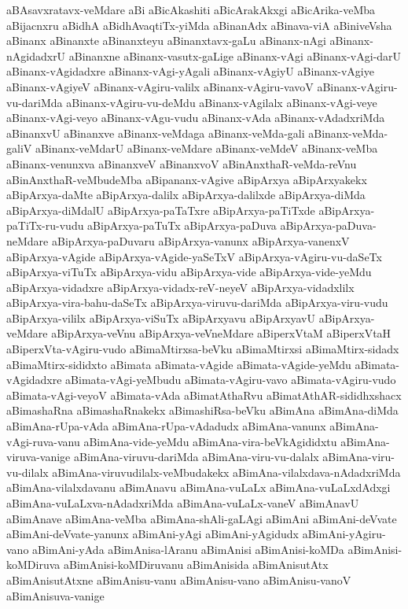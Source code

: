 {aBAsavxratavx-veMdare
aBi
aBicAkashiti
aBicArakAkxgi
aBicArika-veMba
aBijacnxru
aBidhA
aBidhAvaqtiTx-yiMda
aBinanAdx
aBinava-viA
aBiniveVsha
aBinanx
aBinanxte
aBinanxteyu
aBinanxtavx-gaLu
aBinanx-nAgi
aBinanx-nAgidadxrU
aBinanxne
aBinanx-vasutx-gaLige
aBinanx-vAgi
aBinanx-vAgi-darU
aBinanx-vAgidadxre
aBinanx-vAgi-yAgali
aBinanx-vAgiyU
aBinanx-vAgiye
aBinanx-vAgiyeV
aBinanx-vAgiru-valilx
aBinanx-vAgiru-vavoV
aBinanx-vAgiru-vu-dariMda
aBinanx-vAgiru-vu-deMdu
aBinanx-vAgilalx
aBinanx-vAgi-veye
aBinanx-vAgi-veyo
aBinanx-vAgu-vudu
aBinanx-vAda
aBinanx-vAdadxriMda
aBinanxvU
aBinanxve
aBinanx-veMdaga
aBinanx-veMda-gali
aBinanx-veMda-galiV
aBinanx-veMdarU
aBinanx-veMdare
aBinanx-veMdeV
aBinanx-veMba
aBinanx-venunxva
aBinanxveV
aBinanxvoV
aBinAnxthaR-veMda-reVnu
aBinAnxthaR-veMbudeMba
aBipananx-vAgive
aBipArxya
aBipArxyakekx
aBipArxya-daMte
aBipArxya-dalilx
aBipArxya-dalilxde
aBipArxya-diMda
aBipArxya-diMdalU
aBipArxya-paTaTxre
aBipArxya-paTiTxde
aBipArxya-paTiTx-ru-vudu
aBipArxya-paTuTx
aBipArxya-paDuva
aBipArxya-paDuva-neMdare
aBipArxya-paDuvaru
aBipArxya-vanunx
aBipArxya-vanenxV
aBipArxya-vAgide
aBipArxya-vAgide-yaSeTxV
aBipArxya-vAgiru-vu-daSeTx
aBipArxya-viTuTx
aBipArxya-vidu
aBipArxya-vide
aBipArxya-vide-yeMdu
aBipArxya-vidadxre
aBipArxya-vidadx-reV-neyeV
aBipArxya-vidadxlilx
aBipArxya-vira-bahu-daSeTx
aBipArxya-viruvu-dariMda
aBipArxya-viru-vudu
aBipArxya-vililx
aBipArxya-viSuTx
aBipArxyavu
aBipArxyavU
aBipArxya-veMdare
aBipArxya-veVnu
aBipArxya-veVneMdare
aBiperxVtaM
aBiperxVtaH
aBiperxVta-vAgiru-vudo
aBimaMtirxsa-beVku
aBimaMtirxsi
aBimaMtirx-sidadx
aBimaMtirx-sididxto
aBimata
aBimata-vAgide
aBimata-vAgide-yeMdu
aBimata-vAgidadxre
aBimata-vAgi-yeMbudu
aBimata-vAgiru-vavo
aBimata-vAgiru-vudo
aBimata-vAgi-veyoV
aBimata-vAda
aBimatAthaRvu
aBimatAthAR-sididhxshacx
aBimashaRna
aBimashaRnakekx
aBimashiRsa-beVku
aBimAna
aBimAna-diMda
aBimAna-rUpa-vAda
aBimAna-rUpa-vAdadudx
aBimAna-vanunx
aBimAna-vAgi-ruva-vanu
aBimAna-vide-yeMdu
aBimAna-vira-beVkAgididxtu
aBimAna-viruva-vanige
aBimAna-viruvu-dariMda
aBimAna-viru-vu-dalalx
aBimAna-viru-vu-dilalx
aBimAna-viruvudilalx-veMbudakekx
aBimAna-vilalxdava-nAdadxriMda
aBimAna-vilalxdavanu
aBimAnavu
aBimAna-vuLaLx
aBimAna-vuLaLxdAdxgi
aBimAna-vuLaLxva-nAdadxriMda
aBimAna-vuLaLx-vaneV
aBimAnavU
aBimAnave
aBimAna-veMba
aBimAna-shAli-gaLAgi
aBimAni
aBimAni-deVvate
aBimAni-deVvate-yanunx
aBimAni-yAgi
aBimAni-yAgidudx
aBimAni-yAgiru-vano
aBimAni-yAda
aBimAnisa-lAranu
aBimAnisi
aBimAnisi-koMDa
aBimAnisi-koMDiruva
aBimAnisi-koMDiruvanu
aBimAnisida
aBimAnisutAtx
aBimAnisutAtxne
aBimAnisu-vanu
aBimAnisu-vano
aBimAnisu-vanoV
aBimAnisuva-vanige
}
